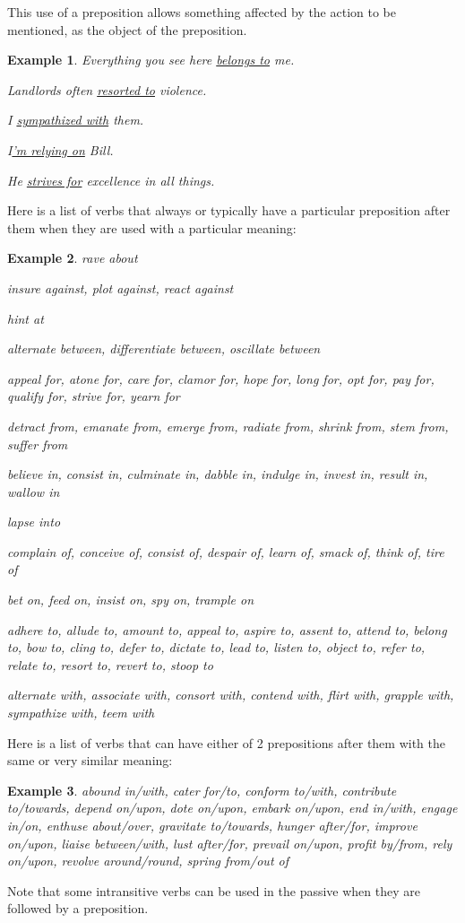 \documentclass[oneside]{book}
\numberwithin{equation}{section}
\newtheorem{example}{Example}[section]
\begin{document}
This use of a preposition allows something affected by the action to be mentioned, as the object of the preposition.
\begin{example}
    Everything you see here \underline{belongs to} me.
    
    Landlords often \underline{resorted to} violence.
    
    I \underline{sympathized with} them.
    
    I\underline{'m relying on} Bill.
    
    He \underline{strives for} excellence in all things.
\end{example}
%
\noindent{} Here is a list of verbs that always or typically have a particular preposition after them when they are used with a particular meaning:
\begin{example}
    rave about
    
    insure against, plot against, react against
    
    hint at
    
    alternate between, differentiate between, oscillate between
    
    appeal for, atone for, care for, clamor for, hope for, long for, opt for, pay for, qualify for, strive for, yearn for
    
    detract from, emanate from, emerge from, radiate from, shrink from, stem from, suffer from
    
    believe in, consist in, culminate in, dabble in, indulge in, invest in, result in, wallow in
    
    lapse into
    
    complain of, conceive of, consist of, despair of, learn of, smack of, think of, tire of
    
    bet on, feed on, insist on, spy on, trample on
    
    adhere to, allude to, amount to, appeal to, aspire to, assent to, attend to, belong to, bow to, cling to, defer to, dictate to, lead to, listen to, object to, refer to, relate to, resort to, revert to, stoop to
    
    alternate with, associate with, consort with, contend with, flirt with, grapple with, sympathize with, teem with
\end{example}
Here is a list of verbs that can have either of 2 prepositions after them with the same or very similar meaning:
\begin{example}
    abound in/with, cater for/to, conform to/with, contribute to/towards, depend on/upon, dote on/upon, embark on/upon, end in/with, engage in/on, enthuse about/over, gravitate to/towards, hunger after/for, improve on/upon, liaise between/with, lust after/for, prevail on/upon, profit by/from, rely on/upon, revolve around/round, spring from/out of
\end{example}
Note that some intransitive verbs can be used in the passive when they are followed by a preposition.
\end{document}
